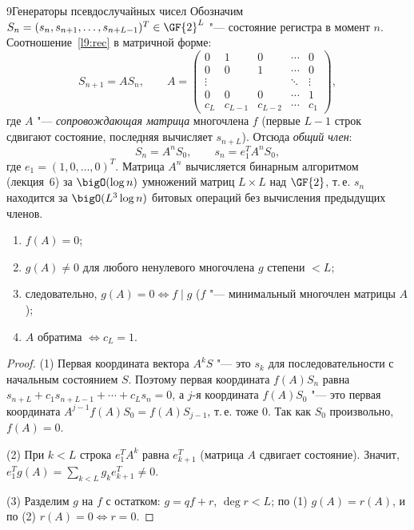 \begin{lecture}{9}{Генераторы псевдослучайных чисел}
Обозначим $S_n = (s_n, s_{n+1}, \dots, s_{n+L-1})^T \in \GF{2}^L$ "--- состояние регистра в момент
$n$. Соотношение~\eqref{l9:rec} в матричной форме:
\[
  S_{n+1} = A S_n, \qquad
  A = \begin{pmatrix}
    0 & 1 & 0 & \cdots & 0\\
    0 & 0 & 1 & \cdots & 0\\
    \vdots & & & \ddots & \vdots\\
    0 & 0 & 0 & \cdots & 1\\
    c_L & c_{L-1} & c_{L-2} & \cdots & c_1
  \end{pmatrix},
\]
где $A$ "--- \emph{сопровождающая матрица} многочлена $f$ (первые $L - 1$ строк сдвигают
состояние, последняя вычисляет $s_{n+L}$). Отсюда \emph{общий член}:
\begin{equation}\label{l9:general}
  S_n = A^n S_0, \qquad s_n = e_1^T A^n S_0,
\end{equation}
где $e_1 = (1, 0, \dots, 0)^T$. Матрица $A^n$ вычисляется бинарным алгоритмом (лекция~6) за
$\bigO(\log n)$ умножений матриц $L \times L$ над $\GF{2}$, т.\,е. $s_n$ находится за
$\bigO(L^3 \log n)$ битовых операций без вычисления предыдущих членов.

\begin{lemma}\label{l9:minpoly}
\begin{enumerate}
  \item $f(A) = 0$;
  \item $g(A) \ne 0$ для любого ненулевого многочлена $g$ степени $< L$;
  \item следовательно, $g(A) = 0 \iff f \mid g$ ($f$ "--- минимальный многочлен матрицы $A$);
  \item $A$ обратима $\iff c_L = 1$.
\end{enumerate}
\end{lemma}

\begin{proof}
(1) Первая координата вектора $A^k S$ "--- это $s_k$ для последовательности с начальным состоянием
$S$. Поэтому первая координата $f(A) S_n$ равна $s_{n+L} + c_1 s_{n+L-1} + \cdots + c_L s_n = 0$,
а $j$-я координата $f(A) S_0$ "--- это первая координата $A^{j-1} f(A) S_0 = f(A) S_{j-1}$, т.\,е.
тоже $0$. Так как $S_0$ произвольно, $f(A) = 0$.

(2) При $k < L$ строка $e_1^T A^k$ равна $e_{k+1}^T$ (матрица $A$ сдвигает состояние). Значит,
$e_1^T g(A) = \sum_{k < L} g_k e_{k+1}^T \ne 0$.

(3) Разделим $g$ на $f$ с остатком: $g = qf + r$, $\deg r < L$; по (1) $g(A) = r(A)$, и по (2)
$r(A) = 0 \iff r = 0$.


\end{proof}
\end{lecture}
